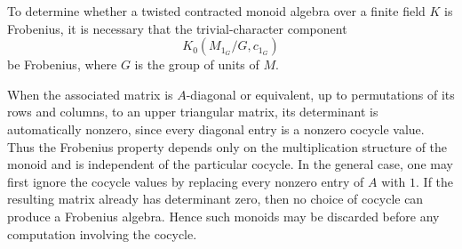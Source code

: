 \documentclass[11pt,reqno]{amsart}
\theoremstyle{plain}
\theoremstyle{remark}
\theoremstyle{definition}
\begin{document}
To determine whether a twisted contracted monoid algebra over a finite field $K$ is Frobenius, it is necessary that the trivial-character component
\[K_0(M_{1_G}/G,c_{1_G})\]
be Frobenius, where $G$ is the group of units of $M$.

When the associated matrix is \(A\)-diagonal or equivalent, up to permutations of its rows and columns, to an upper triangular matrix, its determinant is automatically nonzero, since every diagonal entry is a nonzero cocycle value. Thus the Frobenius property depends only on the multiplication structure of the monoid and is independent of the particular cocycle.
In the general case, one may first ignore the cocycle values by replacing every nonzero entry of \(A\) with \(1\). If the resulting matrix already has determinant zero, then no choice of cocycle can produce a Frobenius algebra. Hence such monoids may be discarded before any computation involving the cocycle.

%
%
%
%
%
%
\end{document}
